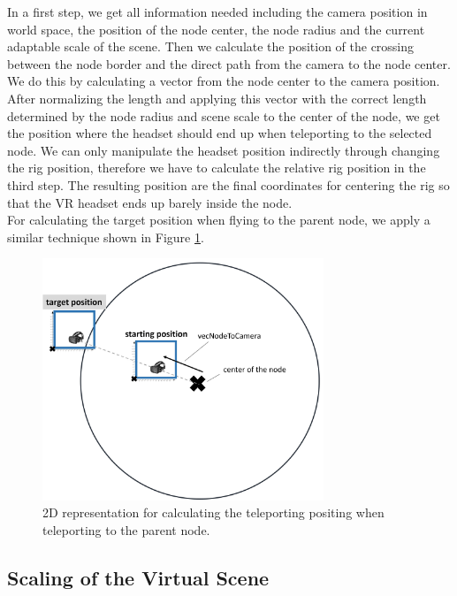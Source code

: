 In a first step, we get all information needed including the camera position in world space, the position of the node center, the node radius and the current adaptable scale of the scene.
Then we calculate the position of the crossing between the node border and the direct path from the camera to the node center. We do this by calculating a vector from the node center to the camera position. After normalizing the length and applying this vector with the correct length determined by the node radius and scene scale to the center of the node, we get the position where the headset should end up when teleporting to the selected node.
We can only manipulate the headset position indirectly through changing the rig position, therefore we have to calculate the relative rig position in the third step. 
The resulting position are the final coordinates for centering the rig so that the VR headset ends up barely inside the node.\\
For calculating the target position when flying to the parent node, we apply a similar technique shown in Figure \ref{fig:vrFlyToParentNode}.

\begin{figure}[h]
    \centering
    \includegraphics[width=0.75\textwidth]{graphics/flyToParentNode.jpg}
    \caption{2D representation for calculating the teleporting positing when teleporting to the parent node.} 
    \label{fig:vrFlyToParentNode} 
\end{figure}

\pagebreak

\subsection{Scaling of the Virtual Scene}
\label{sec:scaling}

